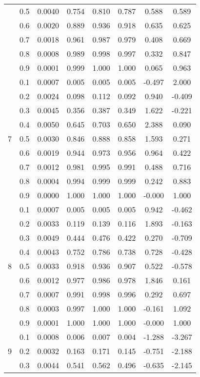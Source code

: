 \documentclass[11pt,a4paper]{report}
\begin{document}
\begin{longtable}{ | c | c || c | c | c | c | c | c | }
 & 0.5 & 0.0040 & 0.754 & 0.810 & 0.787 & 0.588 & 0.589 \\
 & 0.6 & 0.0020 & 0.889 & 0.936 & 0.918 & 0.635 & 0.625 \\
 & 0.7 & 0.0018 & 0.961 & 0.987 & 0.979 & 0.408 & 0.669 \\
 & 0.8 & 0.0008 & 0.989 & 0.998 & 0.997 & 0.332 & 0.847 \\
 & 0.9 & 0.0001 & 0.999 & 1.000 & 1.000 & 0.065 & 0.963 \\
 \hline
\multirow{9}{*}{7} & 0.1 & 0.0007 & 0.005 & 0.005 & 0.005 & -0.497 & 2.000 \\
 & 0.2 & 0.0024 & 0.098 & 0.112 & 0.092 & 0.940 & -0.409 \\
 & 0.3 & 0.0045 & 0.356 & 0.387 & 0.349 & 1.622 & -0.221 \\
 & 0.4 & 0.0050 & 0.645 & 0.703 & 0.650 & 2.388 & 0.090 \\
 & 0.5 & 0.0030 & 0.846 & 0.888 & 0.858 & 1.593 & 0.271 \\
 & 0.6 & 0.0019 & 0.944 & 0.973 & 0.956 & 0.964 & 0.422 \\
 & 0.7 & 0.0012 & 0.981 & 0.995 & 0.991 & 0.488 & 0.716 \\
 & 0.8 & 0.0004 & 0.994 & 0.999 & 0.999 & 0.242 & 0.883 \\
 & 0.9 & 0.0000 & 1.000 & 1.000 & 1.000 & -0.000 & 1.000 \\
 \hline
\multirow{9}{*}{8} & 0.1 & 0.0007 & 0.005 & 0.005 & 0.005 & 0.942 & -0.462 \\
 & 0.2 & 0.0033 & 0.119 & 0.139 & 0.116 & 1.893 & -0.163 \\
 & 0.3 & 0.0049 & 0.444 & 0.476 & 0.422 & 0.270 & -0.709 \\
 & 0.4 & 0.0043 & 0.752 & 0.786 & 0.738 & 0.728 & -0.428 \\
 & 0.5 & 0.0033 & 0.918 & 0.936 & 0.907 & 0.522 & -0.578 \\
 & 0.6 & 0.0012 & 0.977 & 0.986 & 0.978 & 1.846 & 0.161 \\
 & 0.7 & 0.0007 & 0.991 & 0.998 & 0.996 & 0.292 & 0.697 \\
 & 0.8 & 0.0003 & 0.997 & 1.000 & 1.000 & -0.161 & 1.092 \\
 & 0.9 & 0.0001 & 1.000 & 1.000 & 1.000 & -0.000 & 1.000 \\
 \hline
\multirow{9}{*}{9} & 0.1 & 0.0008 & 0.006 & 0.007 & 0.004 & -1.288 & -3.267 \\
 & 0.2 & 0.0032 & 0.163 & 0.171 & 0.145 & -0.751 & -2.188 \\
 & 0.3 & 0.0044 & 0.541 & 0.562 & 0.496 & -0.635 & -2.145 \\

\end{longtable}
\end{document}
